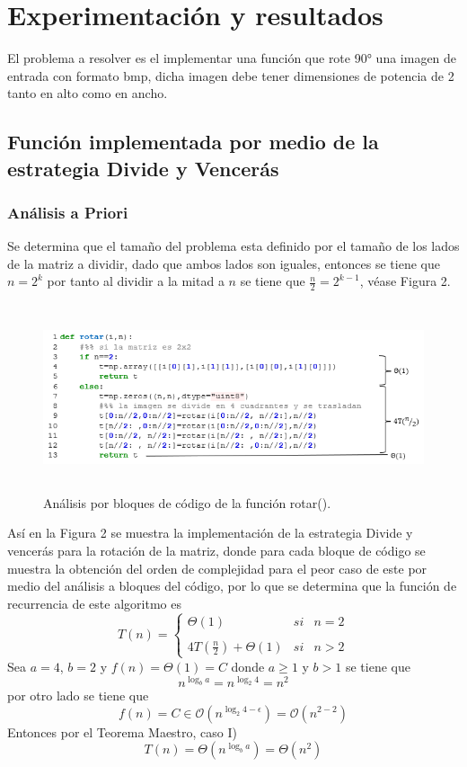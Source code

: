 \documentclass[12pt,twoside]{article}
\begin{document}
    \newpage
    \section{Experimentaci\'on y resultados}
    El problema a resolver es el implementar una función que rote 90° una imagen de entrada con formato bmp, dicha imagen debe tener dimensiones de potencia de 2 tanto en alto como en ancho.
    \subsection{Funci\'on implementada por medio de la estrategia Divide y Vencer\'as}
        \subsubsection{An\'alisis a Priori}
        Se determina que el tama\~no del problema esta definido por el tama\~no de los lados de la matriz a dividir, dado que ambos lados son iguales, entonces se tiene que $n=2^{k}$ por tanto al dividir a la mitad a $n$ se tiene que $\frac{n}{2}=2^{k-1}$, v\'ease Figura 2.
        \begin{figure}[H]
        \centering
        \includegraphics[height=5.5cm]{imagenes/c1.png}
        \caption{Análisis por bloques de código de la función rotar().}
        \end{figure}
        As\'i en la Figura 2 se muestra la implementaci\'on de la estrategia Divide y vencer\'as para la rotaci\'on de la matriz, donde para cada bloque de c\'odigo se muestra la obtenci\'on del orden de complejidad para el peor caso de este por medio del análisis a bloques del código, por lo que se determina que la funci\'on de recurrencia de este algoritmo es 
        $$T(n)= \left\{ \begin{array}{lcc}
            \Theta(1) &   si  & n=2 \\
            \\ 4T(\frac{n}{2})+\Theta(1) &  si & n>2
            \end{array}
            \right.$$
        Sea $a=4$, $b=2$ y $f(n)=\Theta(1)=C$ donde $a\geq1$ y $b>1$ se tiene que
        $$n^{\log_b{a}}=n^{\log_2{4}}=n^{2}$$
        por otro lado se tiene que
        $$f(n)=C\in\mathcal{O}(n^{\log_2{4}-\epsilon})=\mathcal{O}(n^{2-2})$$
        Entonces por el Teorema Maestro, caso I)
        $$T(n)=\Theta(n^{\log_b{a}})=\Theta(n^{2})$$
\end{document}
